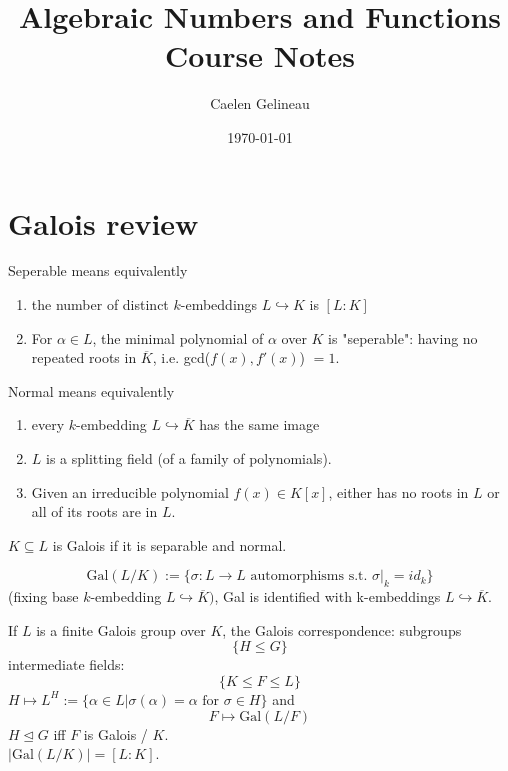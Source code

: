 \documentclass[11pt]{article}
\title{Algebraic Numbers and Functions Course Notes}
\author{Caelen Gelineau}
\date{\today}
\begin{document}
\maketitle

\section{Galois review}
\begin{definition}
    Seperable means equivalently
    \begin{enumerate}
        \item the number of distinct $k$-embeddings $L \hookrightarrow K$ is $[L:K]$
        \item For $\alpha \in L$, the minimal polynomial of $\alpha$ over $K$ is "seperable": having no repeated 
        roots in $\overline{K}$, i.e. gcd($f(x), f'(x)$) $ = 1$.
    \end{enumerate}
    
\end{definition}
\begin{definition}
    Normal means equivalently
    \begin{enumerate}
        \item every $k$-embedding $L \hookrightarrow \overline{K}$ has the same image
        \item $L$ is a splitting field (of a family of polynomials).
        \item Given an irreducible polynomial $f(x) \in K[x]$, either has no roots in $L$ or all of its roots are in $L$.
    \end{enumerate}
    
\end{definition}

\begin{definition}
    $K \subseteq L$ is Galois if it is separable and normal.
\end{definition}

\begin{definition}
    \[
        \text{Gal}(L/K) := \{ \sigma: L \rightarrow L \text{ automorphisms s.t. } \sigma|_k = id_k\}
    \]
    (fixing base $k$-embedding $L \hookrightarrow \overline{K})$, Gal is identified with k-embeddings $L \hookrightarrow \overline{K}$.
\end{definition}
If $L$ is a finite Galois group over $K$, the Galois correspondence:
subgroups
\[
    \{H \le G\}
\]
intermediate fields:
\[
    \{K \le F \le L\}
\]
$H \mapsto L^H := \{\alpha \in L | \sigma(\alpha) = \alpha \text{ for } \sigma \in H\} $ and
\[
    F \mapsto \text{Gal}(L/F)
\]
$H \trianglelefteq G$ iff $F$ is Galois / $K$.\\
$|\text{Gal}(L/K)| = [L:K]$.
\end{document}
